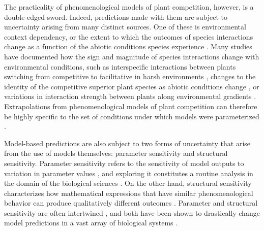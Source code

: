 The practicality of phenomenological models of plant competition, however, is a double-edged sword. Indeed, predictions made with them are subject to uncertainty arising from many distinct sources. One of these is environmental context dependency, or the extent to which the outcomes of species interactions change as a function of the abiotic conditions species experience \citep{chamberlain_how_2014}. Many studies have documented how the sign and magnitude of species interactions change with environmental conditions, such as interspecific interactions between plants switching from competitive to facilitative in harsh environments \citep{callaway_positive_2002, maestre2005change, brooker2008facilitation,maestre2009refining}, changes to the identity of the competitive superior plant species as abiotic conditions change \citep{poorter1986growth, dybzinski2007resource}, or variations in interaction strength between plants along environmental gradients \citep{bimler_accurate_2018, villarreal2009species, lanuza_opposing_2018}. Extrapolations from phenomenological models of plant competition can therefore be highly specific to the set of conditions under which models were parameterized \citep{bimler_accurate_2018}.


Model-based predictions are also subject to two forms of uncertainty that arise from the use of models themselves: parameter sensitivity and structural sensitivity. Parameter sensitivity refers to the sensitivity of model outputs to variation in parameter values \citep{flora_structural_2011}, and exploring it constitutes a routine analysis in the domain of the biological sciences \citep{jorgensen2001fundamentals}. On the other hand, structural sensitivity characterizes how  mathematical expressions that have similar phenomenological behavior can produce qualitatively different outcomes \citep{flora_structural_2011,myerscough1996stability,aldebert2018community}. Parameter and structural sensitivity are often intertwined \citep{wood1999super}, and both have been shown to drastically change model predictions in a vast array of biological systems \citep{flora_structural_2011, wood1999super, poggiale2010far, fussmann2005community,  aldebert2018community}.

